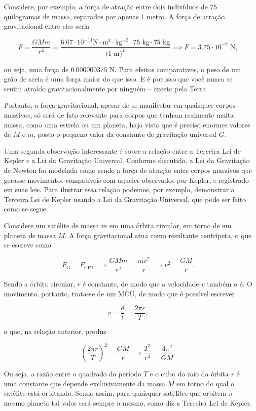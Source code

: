 Considere, por exemplo, a força de atração entre dois indivíduos de $75$ quilogramas de massa, separados por apenas 1 metro. A força de atração gravitacional entre eles seria

$$ F= \dfrac{GMm}{r^2} = \dfrac{6.67 \cdot 10^{-11} \text{N}\cdot\text{m}^2 \cdot \text{kg}^{-2} \cdot 75 \text{ kg}  \cdot 75 \text{ kg}}{(1 \text{ m)}^2} \implies F = 3.75 \cdot 10^{-7} \text{ N},$$

\noindent ou seja, uma força de $0.000000375$ N. Para efeitos comparativos, o peso de um grão de areia é uma força maior do que isso. E é por isso que você nunca se sentiu atraído gravitacionalmente por ninguém -- exceto pela Terra.

Portanto, a força gravitacional, apesar de se manifestar em quaisquer corpos massivos, só será de fato relevante para corpos que tenham realmente muita massa, como uma estrela ou um planeta, haja vista que é preciso enormes valores de $M$ e $m$, posto o pequeno valor da constante de gravitação universal $G.$

Uma segunda observação interessante é sobre a relação entre a Terceira Lei de Kepler e a Lei da Gravitação Universal. Conforme discutido, a Lei da Gravitação de Newton foi modelada como sendo a força de atração entre corpos massivos que gerasse movimentos compatíveis com aqueles observados por Kepler, e registrado em suas leis.  Para ilustrar essa relação podemos, por exemplo, demonstrar a Terceira Lei de Kepler usando a Lei da Gravitação Universal, que pode ser feito como se segue.

Considere um satélite de massa $m$ em uma órbita circular, em torno de um planeta de massa $M.$ A força gravitacional atua como resultante centrípeta, o que se escreve como

$$ F_\text{G} = F_\text{CPT} \implies \dfrac{GMm}{r^2} = \dfrac{mv^2}{r} \implies v^2 = \dfrac{GM}{r}.$$

Sendo a órbita circular, $r$ é constante, de modo que a velocidade $v$ também o é. O movimento, portanto, trata-se de um MCU, de modo que é possível escrever

$$ v = \dfrac{d}{t} = \dfrac{2 \pi r}{T},$$

\noindent o que, na relação anterior, produz

$$ \left(  \dfrac{2 \pi r}{T}  \right)^2 = \dfrac{GM}{r} \implies \boxed{\dfrac{T^2}{r^3} = \dfrac{4 \pi^2}{GM}.}$$

Ou seja, a razão entre o quadrado do período $T$ e o cubo do raio da órbita $r$ é uma constante que depende exclusivamente da massa $M$ em torno do qual o satélite está orbitando. Sendo assim, para quaisquer satélites que orbitem o mesmo planeta tal valor será sempre o mesmo, como diz a Terceira Lei de Kepler.

